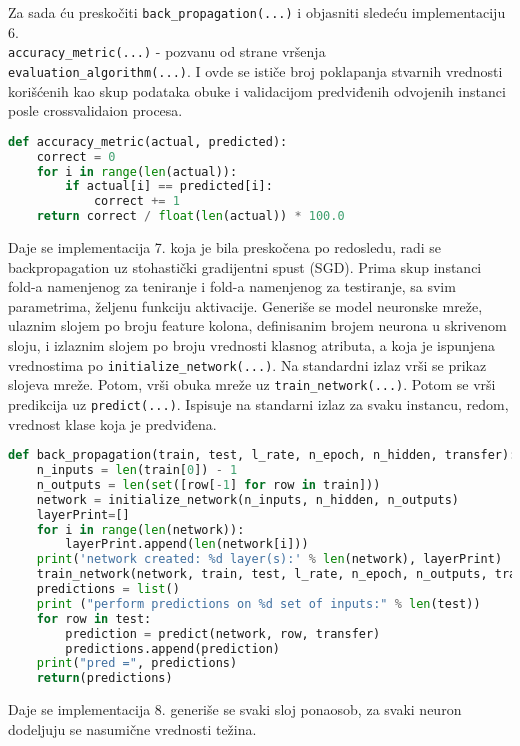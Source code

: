 \documentclass[fontsize=11bp, paper=a4]{scrarticle}
\begin{document}
Za sada ću preskočiti \verb|back_propagation(...)| i objasniti sledeću implementaciju 6.
\\ \verb|accuracy_metric(...)| - pozvanu od strane vršenja \verb|evaluation_algorithm(...)|. I ovde se ističe broj poklapanja stvarnih vrednosti korišćenih kao skup podataka obuke i validacijom predviđenih odvojenih instanci posle crossvalidaion procesa.
\begin{lstlisting}[language=Python, caption=\texttt{accuracy\_metric}]
def accuracy_metric(actual, predicted):
	correct = 0
	for i in range(len(actual)):
		if actual[i] == predicted[i]:
			correct += 1
	return correct / float(len(actual)) * 100.0 
\end{lstlisting}

Daje se implementacija 7. koja je bila preskočena po redosledu, radi se backpropagation uz stohastički gradijentni spust (SGD\cite{sgd}). Prima skup instanci fold-a namenjenog za teniranje i fold-a namenjenog za testiranje, sa svim parametrima, željenu funkciju aktivacije. Generiše se model neuronske mreže, ulaznim slojem po broju feature kolona, definisanim brojem neurona u skrivenom sloju, i izlaznim slojem po broju vrednosti klasnog atributa, a koja je ispunjena vrednostima po \verb|initialize_network(...)|. Na standardni izlaz vrši se prikaz slojeva mreže. Potom, vrši obuka mreže uz \verb|train_network(...)|. Potom se vrši predikcija uz \verb|predict(...)|. Ispisuje na standarni izlaz za svaku instancu, redom, vrednost klase koja je predviđena. 

\begin{lstlisting}[language=Python, caption=\texttt{back\_propagation}]
def back_propagation(train, test, l_rate, n_epoch, n_hidden, transfer):
	n_inputs = len(train[0]) - 1
	n_outputs = len(set([row[-1] for row in train]))
	network = initialize_network(n_inputs, n_hidden, n_outputs)
	layerPrint=[]
	for i in range(len(network)):
		layerPrint.append(len(network[i]))
	print('network created: %d layer(s):' % len(network), layerPrint)
	train_network(network, train, test, l_rate, n_epoch, n_outputs, transfer)
	predictions = list()
	print ("perform predictions on %d set of inputs:" % len(test))
	for row in test:
		prediction = predict(network, row, transfer)
		predictions.append(prediction)
	print("pred =", predictions)
	return(predictions)
\end{lstlisting}

Daje se implementacija 8. generiše se svaki sloj ponaosob, za svaki neuron dodeljuju se nasumične vrednosti težina.
\end{document}
